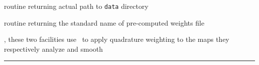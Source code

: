 \begin{related}
  \begin{sulist}{} %
  \item[\htmlref{get\_healpix\_data\_dir}{sub:get_healpix_xxx_dir}] routine returning actual path to \texttt{data} directory
   \item[\htmlref{get\_healpix\_weights\_file}{sub:get_healpix_xxx_file:ghw8f}] routine returning the standard name of pre-computed weights file
   \item[\htmlref{anafast}{fac:anafast}, \htmlref{smoothing}{fac:smoothing}] these two facilities use \thedocid\ to apply quadrature weighting to the maps they respectively 
analyze and smooth
  \end{sulist}
\end{related}

\rule{\hsize}{2mm}

\newpage
